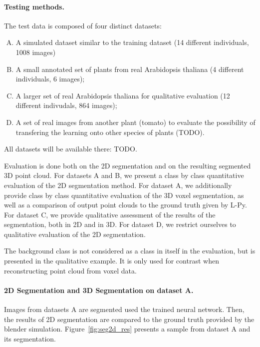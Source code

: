 \paragraph{Testing methods.} The test data is composed of four
distinct datasets:
\begin{enumerate}[A.]
    \item A simulated dataset similar to the training dataset (14 different individuals, 1008 images)
    \item A small annotated set of plants from real Arabidopsis thaliana (4 different individuals, 6 images);
    \item A larger set of real Arabidopsis thaliana for qualitative evaluation (12 different indivudals, 864 images);
    \item A set of real images from another plant (tomato) to evaluate the possibility of transfering the learning onto other species of plants (TODO).
\end{enumerate}
All datasets will be available there: TODO.

Evaluation is done both on the 2D segmentation and on the resulting segmented 3D point cloud. For datasets A and B,
we present a class by class quantitative evaluation of the 2D segmentation method. For dataset A, we additionally  provide
class by class quantitative evaluation of the 3D voxel segmentation, as well as a comparison of output point clouds
to the ground truth given by L-Py. For dataset C, we provide qualitative assessment of the results of the segmentation,
both in 2D and in 3D. For dataset D, we restrict ourselves to qualitative evaluation of the 2D segmentation.


The background class is not considered as a class in itself in the evaluation, but is presented in the qualitative example. It
is only used for contrast when reconstructing point cloud from voxel data.

\paragraph{2D Segmentation and 3D Segmentation on dataset A.}
Images from datasets A are segmented used the trained neural network. Then, the results of 2D segmentation are
compared to the ground truth provided by the blender simulation. Figure~\ref{fig:seg2d_res} presents a sample from
dataset A and its segmentation.

